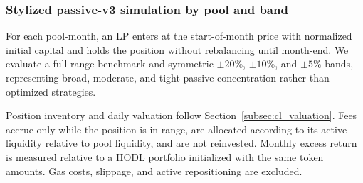 \documentclass[10pt,conference,compsocconf]{IEEEtran}
\begin{document}
\subsubsection{Stylized passive-v3 simulation by pool and band}

For each pool-month, an LP enters at the start-of-month price with normalized initial capital and holds the position without rebalancing until month-end. We evaluate a full-range benchmark and symmetric $\pm20\%$, $\pm10\%$, and $\pm5\%$ bands, representing broad, moderate, and tight passive concentration rather than optimized strategies.

Position inventory and daily valuation follow Section~\ref{subsec:cl_valuation}. Fees accrue only while the position is in range, are allocated according to its active liquidity relative to pool liquidity, and are not reinvested. Monthly excess return is measured relative to a HODL portfolio initialized with the same token amounts. Gas costs, slippage, and active repositioning are excluded.
\end{document}
